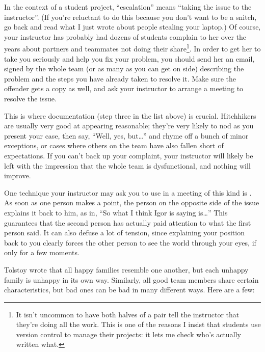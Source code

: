 \documentclass{report}
\begin{document}
In the context of a student project, ``escalation'' means ``taking the
issue to the instructor''.  (If you're reluctant to do this because
you don't want to be a snitch, go back and read what I just wrote
about people stealing your laptop.)  Of course, your instructor has
probably had dozens of students complain to her over the years about
partners and teammates not doing their share\footnote{It isn't
uncommon to have both halves of a pair tell the instructor that
they're doing all the work.  This is one of the reasons I insist that
students use version control to manage their projects: it lets me
check who's actually written what.}.  In order to get her to take you
seriously and help you fix your problem, you should send her an email,
signed by the whole team (or as many as you can get on side)
describing the problem and the steps you have already taken to resolve
it.  Make sure the offender gets a copy as well, and ask your
instructor to arrange a meeting to resolve the issue.

This is where documentation (step three in the list above) is crucial.
Hitchhikers are usually very good at appearing reasonable; they're
very likely to nod as you present your case, then say, ``Well, yes,
but{\ldots}'' and rhyme off a bunch of minor exceptions, or cases
where others on the team have also fallen short of expectations.  If
you can't back up your complaint, your instructor will likely be left
with the impression that the whole team is dysfunctional, and nothing
will improve.

One technique your instructor may ask you to use in a meeting of this
kind is .  As soon as one person makes a
point, the person on the opposite side of the issue explains it back
to him, as in, ``So what I think Igor is saying is{\ldots}'' This
guarantees that the second person has actually paid attention to what
the first person said.  It can also defuse a lot of tension, since
explaining your position back to you clearly forces the other person
to see the world through your eyes, if only for a few moments.


Tolstoy wrote that all happy families resemble one another, but each
unhappy family is unhappy in its own way.  Similarly, all good team
members share certain characteristics, but bad ones can be bad in many
different ways.  Here are a few:
\end{document}
